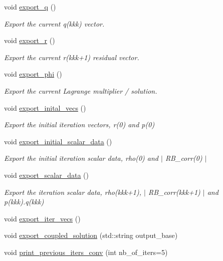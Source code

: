 \begin{DoxyCompactItemize}
void \hyperlink{classcarl_1_1_f_e_t_i___operations_afc54dc93100f7a5def948798fc50ea7d}{export\+\_\+q} ()
\begin{DoxyCompactList}\small\item\em Export the current {\ttfamily q(kkk)} vector. \end{DoxyCompactList}\item 
void \hyperlink{classcarl_1_1_f_e_t_i___operations_abfd402a785f614ea48a8b6862f34ab17}{export\+\_\+r} ()
\begin{DoxyCompactList}\small\item\em Export the current {\ttfamily r(kkk+1)} residual vector. \end{DoxyCompactList}\item 
void \hyperlink{classcarl_1_1_f_e_t_i___operations_ac56c6979421d602840beade3e58fd281}{export\+\_\+phi} ()
\begin{DoxyCompactList}\small\item\em Export the current Lagrange multiplier / solution. \end{DoxyCompactList}\item 
void \hyperlink{classcarl_1_1_f_e_t_i___operations_a8b61ae513a10da13f8ebf00e8ec2ec7c}{export\+\_\+inital\+\_\+vecs} ()
\begin{DoxyCompactList}\small\item\em Export the initial iteration vectors, {\ttfamily r(0)} and {\ttfamily p(0)} \end{DoxyCompactList}\item 
void \hyperlink{classcarl_1_1_f_e_t_i___operations_ae25352065815843ea6ccbe404a4440af}{export\+\_\+initial\+\_\+scalar\+\_\+data} ()
\begin{DoxyCompactList}\small\item\em Export the initial iteration scalar data, {\ttfamily rho(0)} and {\ttfamily $\vert$ R\+B\+\_\+corr(0) $\vert$} \end{DoxyCompactList}\item 
void \hyperlink{classcarl_1_1_f_e_t_i___operations_a79a628cc65336053b9a867bffa950862}{export\+\_\+scalar\+\_\+data} ()
\begin{DoxyCompactList}\small\item\em Export the iteration scalar data, {\ttfamily rho(kkk+1)}, {\ttfamily $\vert$ R\+B\+\_\+corr(kkk+1) $\vert$} and {\ttfamily p(kkk).q(kkk)} \end{DoxyCompactList}\item 
void \hyperlink{classcarl_1_1_f_e_t_i___operations_adf5b285484e12d14795ebc27c8db3619}{export\+\_\+iter\+\_\+vecs} ()
\item 
void \hyperlink{classcarl_1_1_f_e_t_i___operations_a9b687ed1a7c2d0784f79de08b65f0668}{export\+\_\+coupled\+\_\+solution} (std\+::string output\+\_\+base)
\item 
void \hyperlink{classcarl_1_1_f_e_t_i___operations_aa30d53f951fdc6b6392d45c1f4ee8b1e}{print\+\_\+previous\+\_\+iters\+\_\+conv} (int nb\+\_\+of\+\_\+iters=5)
\end{DoxyCompactItemize}
